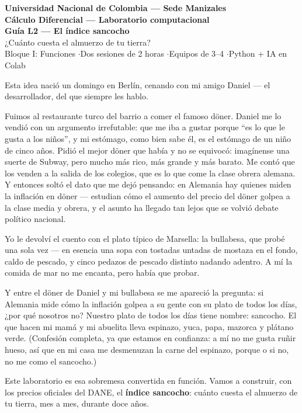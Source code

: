 \documentclass[12pt,letterpaper]{article}
\begin{document}
\begin{center}
    {\Large \textbf{Universidad Nacional de Colombia --- Sede Manizales}}\\
    {\large \textbf{Cálculo Diferencial --- Laboratorio computacional}}\\[0.8em]
    {\LARGE \textbf{Guía L2 --- El índice sancocho}}\\[0.4em]
    {\large ¿Cuánto cuesta el almuerzo de tu tierra?}\\[0.5em]
    {\normalsize Bloque I: Funciones \quad$\cdot$\quad Dos sesiones de 2 horas \quad$\cdot$\quad Equipos de 3--4 \quad$\cdot$\quad Python + IA en Colab}
\end{center}

\begin{cajabitacora}
Esta idea nació un domingo en Berlín, cenando con mi amigo Daniel --- el desarrollador, del que siempre les hablo.

Fuimos al restaurante turco del barrio a comer el famoso döner. Daniel me lo vendió con un argumento irrefutable: que me iba a gustar porque ``es lo que le gusta a los niños'', y mi estómago, como bien sabe él, es el estómago de un niño de cinco años. Pidió el mejor döner que había y no se equivocó: imagínense una suerte de Subway, pero mucho más rico, más grande y más barato. Me contó que los venden a la salida de los colegios, que es lo que come la clase obrera alemana. Y entonces soltó el dato que me dejó pensando: en Alemania hay quienes miden la inflación en döner --- estudian cómo el aumento del precio del döner golpea a la clase media y obrera, y el asunto ha llegado tan lejos que se volvió debate político nacional.

Yo le devolví el cuento con el plato típico de Marsella: la bullabesa, que probé una sola vez --- en esencia una sopa con tostadas untadas de mostaza en el fondo, caldo de pescado, y cinco pedazos de pescado distinto nadando adentro. A mí la comida de mar no me encanta, pero había que probar.

Y entre el döner de Daniel y mi bullabesa se me apareció la pregunta: si Alemania mide cómo la inflación golpea a su gente con su plato de todos los días, ¿por qué nosotros no? Nuestro plato de todos los días tiene nombre: sancocho. El que hacen mi mamá y mi abuelita lleva espinazo, yuca, papa, mazorca y plátano verde. (Confesión completa, ya que estamos en confianza: a mí no me gusta ruñir hueso, así que en mi casa me desmenuzan la carne del espinazo, porque o si no, no me como el sancocho.)

Este laboratorio es esa sobremesa convertida en función. Vamos a construir, con los precios oficiales del DANE, el \textbf{índice sancocho}: cuánto cuesta el almuerzo de tu tierra, mes a mes, durante doce años.
\end{cajabitacora}
\end{document}
